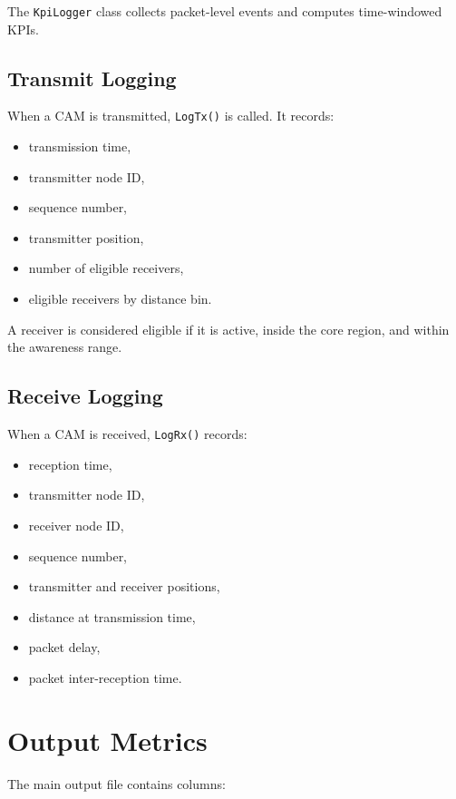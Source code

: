 \documentclass[11pt,a4paper]{article}
\begin{document}
The \texttt{KpiLogger} class collects packet-level events and computes time-windowed KPIs.

\subsection{Transmit Logging}

When a CAM is transmitted, \texttt{LogTx()} is called. It records:

\begin{itemize}
    \item transmission time,
    \item transmitter node ID,
    \item sequence number,
    \item transmitter position,
    \item number of eligible receivers,
    \item eligible receivers by distance bin.
\end{itemize}

A receiver is considered eligible if it is active, inside the core region, and within the awareness range.

\subsection{Receive Logging}

When a CAM is received, \texttt{LogRx()} records:

\begin{itemize}
    \item reception time,
    \item transmitter node ID,
    \item receiver node ID,
    \item sequence number,
    \item transmitter and receiver positions,
    \item distance at transmission time,
    \item packet delay,
    \item packet inter-reception time.
\end{itemize}

\section{Output Metrics}

The main output file contains columns:
\end{document}
